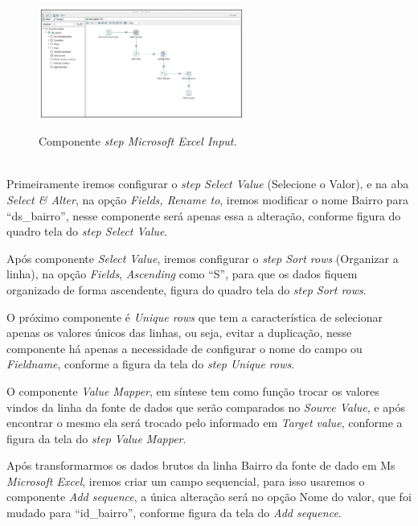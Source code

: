 \begin{figure}[H]
	\vspace*{0,2cm}
    \centering
    \caption{Componente \textit{step Microsoft Excel Input.}}
    \includegraphics[width=0.6\textwidth]{./04-figuras/figura-dim-bairro}
    \label{fig:ilustfigdimbairro}
\end{figure}
\vspace*{-0,9cm}
{\raggedright {}} \\

Primeiramente iremos configurar o \textit{step Select Value} (Selecione o Valor), e na aba \textit{Select & Alter}, na op\c{c}\~{a}o \textit{Fields, Rename to}, iremos modificar o nome Bairro para ``ds\_bairro'', nesse componente ser\'{a} apenas essa a altera\c{c}\~{a}o, conforme figura do quadro tela do \textit{step Select Value}.

Ap\'os  componente \textit{Select Value}, iremos configurar o \textit{step Sort rows} (Organizar a linha), na op\c{c}\~{a}o \textit{Fields}, \textit{Ascending} como ``S'', para que os dados fiquem organizado de forma ascendente, figura do quadro tela do \textit{step Sort rows}.

O pr\'oximo componente \'{e} \textit{Unique rows} que tem a característica de selecionar apenas os valores únicos das linhas, ou seja, evitar a duplica\c{c}\~{a}o, nesse componente h\'{a} apenas a necessidade de configurar o nome do campo ou \textit{Fieldname}, conforme a figura da tela do \textit{step Unique rows}.

O componente \textit{Value Mapper}, em síntese tem como fun\c{c}\~{a}o trocar os valores vindos da linha da fonte de dados que ser\~{a}o comparados no \textit{Source Value}, e ap\'os encontrar o mesmo ela ser\'{a} trocado pelo informado em \textit{Target value}, conforme a figura da tela do \textit{step Value Mapper}.

Ap\'os transformarmos os dados brutos da linha Bairro da fonte de dado em Ms \textit{Microsoft Excel}, iremos criar um campo sequencial, para isso usaremos o componente \textit{Add sequence}, a única altera\c{c}\~{a}o ser\'{a} no op\c{c}\~{a}o Nome do valor, que foi mudado para ``id\_bairro'', conforme figura da tela do \textit{Add sequence}.

